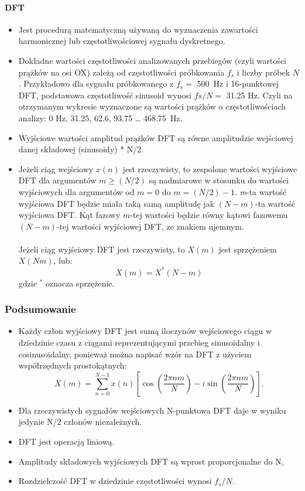 \documentclass[a4paper,twoside]{report}
\begin{document}
\paragraph{DFT}
\begin{itemize}
	\item Jest procedurą matematyczną używaną do wyznaczenia zawartości harmonicznej lub częstotliwościowej sygnału dyskretnego.
	\item Dokładne wartości częstotliwości analizowanych przebiegów (czyli wartości prążków na osi OX) zależą od częstotliwości próbkowania $ f_s $ i liczby próbek $N$. Przykładowo dla sygnału próbkowanego z $ f_s = $ 500~Hz  i 16-punktowej DFT, podstawowa częstotliwość sinusoid wynosi $ fs/N=$ 31.25 Hz. Czyli na otrzymanym wykresie wyznaczone są wartości prążków o częstotliwościach analizy: 0 Hz, 31.25, 62.6, 93.75 … 468.75~Hz.
	\item Wyjściowe wartości amplitud prążków DFT są równe amplitudzie wejściowej danej składowej (sinusoidy) * N/2.
	\item Jeżeli ciąg wejściowy $ x(n) $ jest rzeczywisty, to zespolone wartości wyjściowe DFT dla argumentów $ m \ge (N/2) $ są nadmiarowe w stosunku do wartości wyjściowych dla argumentów od $ m = 0 $ do $ m = (N/2)-1 $. \textit{m}-ta wartość wyjściowa DFT będzie miała taką samą amplitudę jak $(N-m)$-ta wartość wyjściowa DFT. Kąt fazowy $m$-tej wartości będzie równy kątowi fazowemu $(N-m)$-tej wartości wyjściowej DFT, ze znakiem ujemnym. \\\\
	Jeżeli ciąg wyjściowy DFT jest rzeczywisty, to $X(m)$ jest sprzężeniem $X(Nm)$, lub:
\begin{equation}
X(m) = X^*(N-m)
\end{equation}
gdzie $ ^* $ oznacza sprzężenie.
\end{itemize}

\subsubsection{Podsumowanie}
\begin{itemize}
	\item Każdy człon wyjściowy DFT jest sumą iloczynów wejściowego ciągu w dziedzinie czasu z ciągami reprezentującymi przebieg sinusoidalny i cosinusoidalny, ponieważ można napisać wzór na DFT z użyciem współrzędnych prostokątnych:
	\begin{equation}
	X(m)= \sum_{n=0}^{N-1}{x(n) [\cos(\frac{2 \pi n m}{N}) - i \sin(\frac{2 \pi n m}{N})]}.
	\end{equation}
	\item Dla rzeczywistych sygnałów wejściowych N-punktowa DFT daje w wyniku jedynie N/2 członów niezależnych.
	\item DFT jest operacją liniową.
	\item Amplitudy składowych wyjściowych DFT są wprost proporcjonalne do N,
	\item Rozdzielczość DFT w dziedzinie częstotliwości wynosi $ f_s/N $.
\end{itemize}
\end{document}
